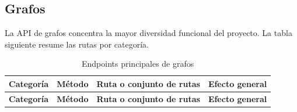\documentclass[12pt,onecolumn]{IEEEtran}
\begin{document}
\subsection{Grafos}
La API de grafos concentra la mayor diversidad funcional del proyecto. La tabla siguiente resume las rutas por categoría.
\small
\setlength{\LTleft}{0pt}
\setlength{\LTright}{0pt}
\begin{longtable}{%
    >{\raggedright\arraybackslash}p{2.8cm}
    >{\raggedright\arraybackslash}p{2.2cm}
    >{\raggedright\arraybackslash}p{5.1cm}
    >{\raggedright\arraybackslash}p{4.8cm}
}
\caption{Endpoints principales de grafos}\label{tab:endpoints-graphs}\\
\toprule
\textbf{Categoría} & \textbf{Método} & \textbf{Ruta o conjunto de rutas} & \textbf{Efecto general} \\
\midrule
\endfirsthead

\toprule
\textbf{Categoría} & \textbf{Método} & \textbf{Ruta o conjunto de rutas} & \textbf{Efecto general} \\
\midrule
\endhead


\end{longtable}
\end{document}

